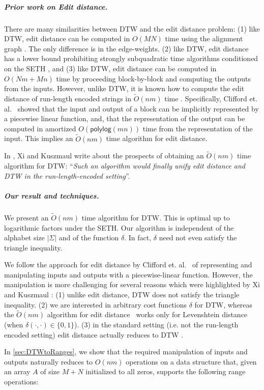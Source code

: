 \documentclass[a4paper,UKenglish,cleveref, autoref, thm-restate]{lipics-v2021}
\newcommand{\para}[1]{\vspace{-0.1in} \subparagraph*{#1}}
\newcommand{\polylog}{\mathsf{polylog}}
\begin{document}
\para{Prior work on Edit distance.}
There are many similarities between DTW and the edit distance problem: (1)  
like DTW, edit distance can be computed
in $O(MN)$ time using the alignment graph \cite{vintzyuk1968,
  needleman1970general}. The only difference is in the edge-weights. (2) 
like DTW, edit distance has a lower bound prohibiting strongly
subquadratic time algorithms conditioned on the SETH \cite{DTWhard,
  DTWhard2,DBLP:conf/icalp/Kuszmaul19}, and (3) like DTW, edit distance can be computed in $O(Nm+Mn)$ time by proceeding block-by-block and computing the outputs from the inputs. However, unlike DTW, it is known how to compute the
edit distance of run-length encoded strings in $\tilde{O}(nm)$ time
\cite{rle1, rle2, rle3, rle4, rle5, rle6, rle7, rle8, rle9}. Specifically, Clifford et. al.~\cite{rle1} showed that the input and output of a block can be implicitly represented by a piecewise linear function, and, that the representation of the output can be computed in amortized $O(\polylog (mn))$ time from the representation of the input. This implies an $\tilde{O}(nm)$ time algorithm for edit distance. 

In \cite{DBLP:conf/esa/XiK22}, Xi and Kuszmaul  write about the prospects of obtaining an $\tilde{O}(nm)$ time algorithm for DTW: 
``{\em Such an
algorithm would finally unify edit distance and DTW in the
run-length-encoded setting}''. 

\para{Our result and techniques.}
 We present an $\tilde O(nm)$ time algorithm for DTW. This is optimal up to logarithmic factors under the SETH. Our algorithm is independent of the alphabet size $|\Sigma|$ and of the function $\delta$. In fact, $\delta$ need not even satisfy the triangle inequality. 
 
 We follow the approach for edit distance by Clifford et. al.~\cite{rle1} of representing and manipulating inputs and outputs with a piecewise-linear function. However, the manipulation is more challenging for several reasons which were highlighted by Xi and Kuszmaul \cite{DBLP:conf/esa/XiK22}: (1) unlike edit distance, DTW does not satisfy the triangle inequality. 
  (2) we are interested in arbitrary cost functions $\delta$ for DTW, whereas the $\tilde{O}(nm)$ algorithm for edit distance~\cite{rle1} works only for Levenshtein distance (when  $\delta(\cdot,\cdot) \in \{0,1\}$). 
  (3) in the standard setting (i.e. not the run-length encoded setting)  
edit
distance actually reduces to DTW
\cite{DBLP:conf/icalp/Kuszmaul19}. 

In \cref{sec:DTWtoRanges}, we show  that the required manipulation of inputs and outputs naturally reduces to $O(nm)$ operations on a data structure that, given an array $A$ of size $M+N$ initialized to all zeros, supports the following range operations:
 
\end{document}

